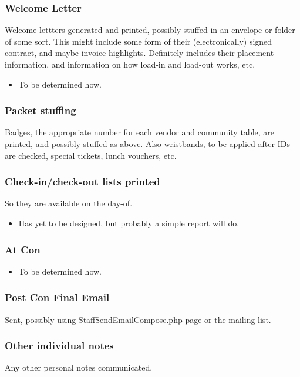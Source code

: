 \documentclass[captions=tablesignature]{scrartcl}
\begin{document}
\subsubsection{Welcome Letter}
\label{sec-3-2-20}
Welcome lettters generated and printed, possibly stuffed in an
envelope or folder of some sort.
This might include some form of their (electronically) signed
contract, and maybe invoice highlights.  Definitely includes their
placement information, and information on how load-in and load-out
works, etc.
\begin{itemize}
\item To be determined how.
\end{itemize}

\subsubsection{Packet stuffing}
\label{sec-3-2-21}
Badges, the appropriate number for each vendor and community
table, are printed, and possibly stuffed as above.  Also
wristbands, to be applied after IDs are checked, special tickets,
lunch vouchers, etc.

\subsubsection{Check-in/check-out lists printed}
\label{sec-3-2-22}
So they are available on the day-of.
\begin{itemize}
\item Has yet to be designed, but probably a simple report will do.
\end{itemize}

\subsubsection{At Con}
\label{sec-3-2-23}
\begin{itemize}
\item To be determined how.
\end{itemize}

\subsubsection{Post Con Final Email}
\label{sec-3-2-24}
Sent, possibly using StaffSendEmailCompose.php page or
the mailing list.

\subsubsection{Other individual notes}
\label{sec-3-2-25}
Any other personal notes communicated.
\end{document}
